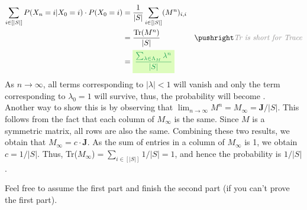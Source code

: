 \documentclass[12pt,titlepage]{report}
\begin{document}
\begin{enumerate}[label=(\alph*)]
    \begin{align*}
        \sum_{i\in[|S|]} P(X_n=i|X_0=i)\cdot P(X_0=i) &= \frac{1}{|S|}\sum_{i\in[|S|]} (M^n)_{i,i} \\
        &= \frac{\text{Tr($M^n$)}}{|S|} \comment{\textit{Tr is short for Trace}} \\
        &= \ans{$\dfrac{\sum_{\lambda\in\Lambda_M}\lambda^n}{|S|}$}
    \end{align*}
    As $n\rightarrow\infty$, all terms corresponding to $|\lambda|<1$ will vanish and only the term corresponding to $\lambda_0=1$ will survive, thus, the probability will become .\\
    Another way to show this is by observing that $\lim_{n\rightarrow\infty} M^n=M_\infty=\mathbf{J}/|S|$. This follows from the fact that each column of $M_\infty$ is the same. Since $M$ is a symmetric matrix, all rows are also the same. Combining these two results, we obtain that $M_\infty=c\cdot \mathbf{J}$. As the sum of entries in a column of $M_\infty$ is 1, we obtain $c=1/|S|$. Thus, Tr($M_\infty$)$=\sum_{i\in[|S|]} 1/|S| = 1$, and hence the probability is $1/|S|$.
\end{enumerate}
    Feel free to assume the first part and finish the second part (if you can’t prove the first part).

\newpage
\end{document}

